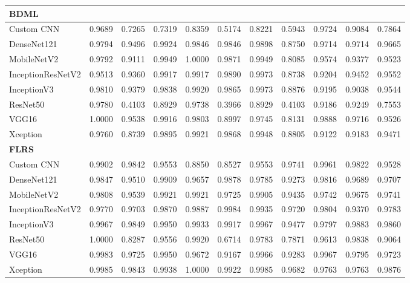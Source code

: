 \documentclass[a4paper,fleqn]{cas-dc}
\begin{document}
\begin{table}[t]
\begin{tabular}{l *{10}{r}}
        \midrule
        \multicolumn{11}{l}{\textbf{BDML}} \\
        \midrule
        Custom CNN        & 0.9689 & 0.7265 & 0.7319 & 0.8359 & 0.5174 & 0.8221 & 0.5943 & 0.9724 & 0.9084 & 0.7864 \\
        DenseNet121       & 0.9794 & 0.9496 & 0.9924 & 0.9846 & 0.9846 & 0.9898 & 0.8750 & 0.9714 & 0.9714 & 0.9665 \\
        MobileNetV2       & 0.9792 & 0.9111 & 0.9949 & 1.0000 & 0.9871 & 0.9949 & 0.8085 & 0.9574 & 0.9377 & 0.9523 \\
        InceptionResNetV2 & 0.9513 & 0.9360 & 0.9917 & 0.9917 & 0.9890 & 0.9973 & 0.8738 & 0.9204 & 0.9452 & 0.9552 \\
        InceptionV3       & 0.9810 & 0.9379 & 0.9838 & 0.9920 & 0.9865 & 0.9973 & 0.8876 & 0.9195 & 0.9038 & 0.9544 \\
        ResNet50          & 0.9780 & 0.4103 & 0.8929 & 0.9738 & 0.3966 & 0.8929 & 0.4103 & 0.9186 & 0.9249 & 0.7553 \\
        VGG16             & 1.0000 & 0.9538 & 0.9916 & 0.9803 & 0.8997 & 0.9745 & 0.8131 & 0.9888 & 0.9716 & 0.9526 \\
        Xception          & 0.9760 & 0.8739 & 0.9895 & 0.9921 & 0.9868 & 0.9948 & 0.8805 & 0.9122 & 0.9183 & 0.9471 \\

        \midrule
        \multicolumn{11}{l}{\textbf{FLRS}} \\
        \midrule
        Custom CNN        & 0.9902 & 0.9842 & 0.9553 & 0.8850 & 0.8527 & 0.9553 & 0.9741 & 0.9961 & 0.9822 & 0.9528 \\
        DenseNet121       & 0.9847 & 0.9510 & 0.9909 & 0.9657 & 0.9878 & 0.9785 & 0.9273 & 0.9816 & 0.9689 & 0.9707 \\
        MobileNetV2       & 0.9808 & 0.9539 & 0.9921 & 0.9921 & 0.9725 & 0.9905 & 0.9435 & 0.9742 & 0.9675 & 0.9741 \\
        InceptionResNetV2 & 0.9770 & 0.9703 & 0.9870 & 0.9887 & 0.9984 & 0.9935 & 0.9720 & 0.9804 & 0.9370 & 0.9783 \\
        InceptionV3       & 0.9967 & 0.9849 & 0.9950 & 0.9933 & 0.9917 & 0.9967 & 0.9477 & 0.9797 & 0.9883 & 0.9860 \\
        ResNet50          & 1.0000 & 0.8287 & 0.9556 & 0.9920 & 0.6714 & 0.9783 & 0.7871 & 0.9613 & 0.9838 & 0.9064 \\
        VGG16             & 0.9983 & 0.9725 & 0.9950 & 0.9672 & 0.9167 & 0.9966 & 0.9283 & 0.9967 & 0.9795 & 0.9723 \\
        Xception          & 0.9985 & 0.9843 & 0.9938 & 1.0000 & 0.9922 & 0.9985 & 0.9682 & 0.9763 & 0.9763 & 0.9876 \\


\end{tabular}
\end{table}
\end{document}
